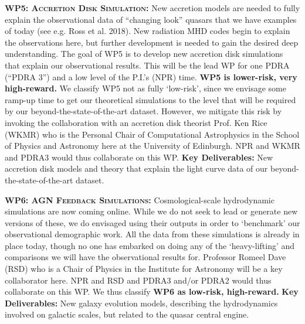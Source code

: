 \documentclass[oneside, a4paper, onecolumn, 11pt]{article}
\begin{document}
\smallskip
\smallskip
\noindent
\textbf{\textsc{WP5: Accretion Disk Simulation:}} 
New accretion models are needed to fully explain the observational
data of ``changing look'' quasars that we have examples of today (see
e.g. Ross et al. 2018). New radiation MHD codes begin to explain the
observations here, but further development is needed to gain the
desired deep understanding. 
The goal of WP5 is to develop new accretion disk simulations that
explain our observational results.  This will be the lead WP for one
PDRA (``PDRA 3'') and a low level of the P.I.'s (NPR) time. 
{\bf WP5 is lower-risk, very high-reward.} We
classify WP5 not as fully `low-risk', since we envisage some ramp-up
time to get our theoretical simulations to the level that will be required by 
our beyond-the-state-of-the-art dataset. However, we mitigate this risk
by invoking the collaboration with an accretion disk theorist
Prof. Ken Rice (WKMR) who is the Personal Chair of Computational
Astrophysics in the School of Physics and Astronomy here at the
University of Edinburgh. NPR and WKMR and PDRA3 would thus collaborate 
on this WP. 
{\bf Key Deliverables:} New accretion disk models and theory that explain the 
light curve data of our beyond-the-state-of-the-art dataset. 


\smallskip
\smallskip
\noindent
\textbf{\textsc{WP6: AGN Feedback Simulations:}} 
Cosmological-scale hydrodynamic simulations are now coming online. 
While we do not seek to lead or generate new versions of these, we do 
envisaged using their outputs in order to `benchmark' our observational 
demographic work. 
All the data from these simulations is already in place today, though no one 
has embarked on doing any of the `heavy-lifting' and comparisons we will 
have the observational results for. Professor Romeel Dave (RSD) who is a Chair of Physics 
in the Institute for Astronomy will be a key collaborator here. 
NPR and RSD and PDRA3 and/or PDRA2 would thus collaborate on this WP. 
We thus classify {\bf WP6 as low-risk, high-reward.}
{\bf Key Deliverables:} New galaxy evolution models, describing the hydrodynamics 
involved on galactic scales, but related to the quasar central engine. 
\end{document}
